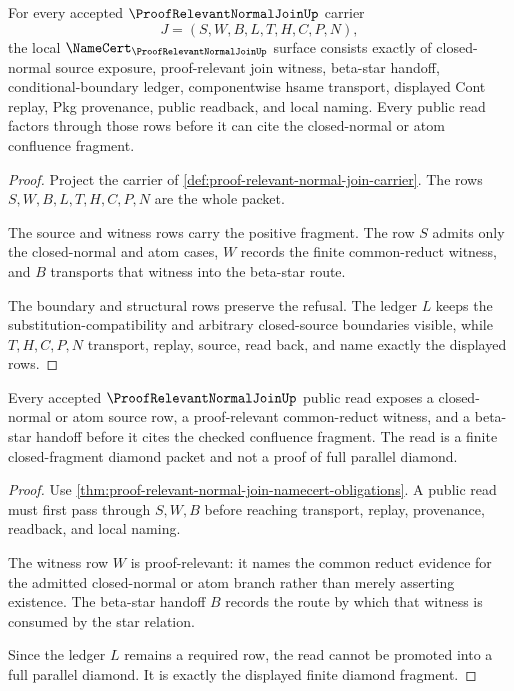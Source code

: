 \begin{theorem}\label{thm:proof-relevant-normal-join-namecert-obligations}
For every accepted $\ProofRelevantNormalJoinUp$ carrier
$$
J=(S,W,B,L,T,H,C,P,N),
$$
the local $\NameCert_{\ProofRelevantNormalJoinUp}$ surface consists exactly of closed-normal source exposure, proof-relevant join witness, beta-star handoff, conditional-boundary ledger, componentwise hsame transport, displayed Cont replay, Pkg provenance, public readback, and local naming. Every public read factors through those rows before it can cite the closed-normal or atom confluence fragment.
\end{theorem}
\begin{proof}
Project the carrier of \autoref{def:proof-relevant-normal-join-carrier}. The rows $S,W,B,L,T,H,C,P,N$ are the whole packet.

The source and witness rows carry the positive fragment. The row $S$ admits only the closed-normal and atom cases, $W$ records the finite common-reduct witness, and $B$ transports that witness into the beta-star route.

The boundary and structural rows preserve the refusal. The ledger $L$ keeps the substitution-compatibility and arbitrary closed-source boundaries visible, while $T,H,C,P,N$ transport, replay, source, read back, and name exactly the displayed rows.
\end{proof}

\begin{theorem}\label{thm:proof-relevant-normal-join-diamond-fragment}
Every accepted $\ProofRelevantNormalJoinUp$ public read exposes a closed-normal or atom source row, a proof-relevant common-reduct witness, and a beta-star handoff before it cites the checked confluence fragment. The read is a finite closed-fragment diamond packet and not a proof of full parallel diamond.
\end{theorem}
\begin{proof}
Use \autoref{thm:proof-relevant-normal-join-namecert-obligations}. A public read must first pass through $S,W,B$ before reaching transport, replay, provenance, readback, and local naming.

The witness row $W$ is proof-relevant: it names the common reduct evidence for the admitted closed-normal or atom branch rather than merely asserting existence. The beta-star handoff $B$ records the route by which that witness is consumed by the star relation.

Since the ledger $L$ remains a required row, the read cannot be promoted into a full parallel diamond. It is exactly the displayed finite diamond fragment.
\end{proof}


